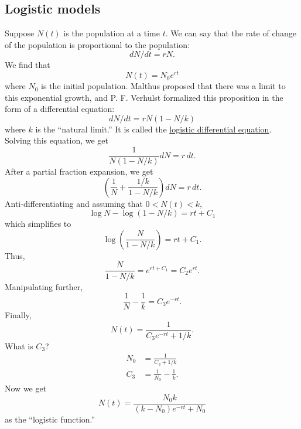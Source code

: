 \documentclass[11pt, oneside]{article}   	%
\begin{document}
\subsection{Logistic models}
Suppose $N(t)$ is the population at a time $t$. We can say that the rate of change of the population is proportional to the population:
$$
dN/dt = rN.
$$
We find that 
$$
N(t) = N_0e^{rt}
$$
where $N_0$ is the initial population. Malthus proposed that there was a limit to this exponential growth, and P. F. Verhulst formalized this proposition in the form of a differential equation:
$$
dN/dt = rN(1 - N/k)
$$
where $k$ is the ``natural limit.'' It is called the \underline{logistic differential equation}. Solving this equation, we get
$$
\frac{1}{N(1-N/k)}dN = r\, dt.
$$
After a partial fraction expansion, we get
$$
\left( \frac{1}{N} + \frac{1/k}{1-N/k}\right)dN = r\, dt.
$$
Anti-differentiating and assuming that $0<N(t)<k$,
$$
\log N - \log (1-N/k) = rt + C_1
$$
which simplifies to 
$$
\log \left(\frac{N}{1-N/k}\right) = rt + C_1.
$$
Thus,
$$
\frac{N}{1-N/k} = e^{rt +C_1} = C_2 e^{rt}.
$$
Manipulating further,
$$
\frac{1}{N} - \frac{1}{k} = C_3e^{-rt}.
$$
Finally,
$$
N(t) = \frac{1}{C_3e^{-rt} + 1/k}.
$$
What is $C_3$?
\begin{align*}
N_0 &= \frac{1}{C_3 + 1/k}\\
C_3 &= \frac{1}{N_0} - \frac{1}{k}.
\end{align*}
Now we get
$$
N(t) = \frac{N_0k}{(k-N_0)e^{-rt} + N_0}
$$
as the ``logistic function.''
\end{document}

